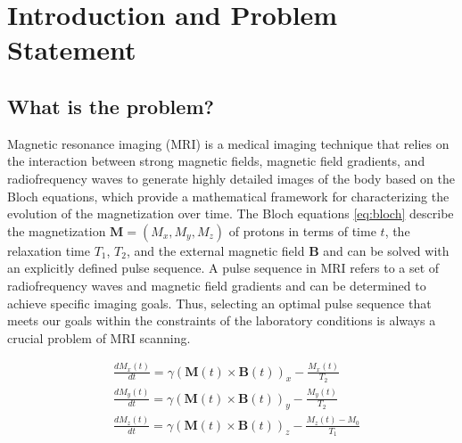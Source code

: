 \section{Introduction and Problem Statement}
\subsection{What is the problem?}
Magnetic resonance imaging (MRI) is a medical imaging technique that relies on the interaction between strong magnetic fields, magnetic field gradients, and radiofrequency waves to generate highly detailed images of the body based on the Bloch equations, which provide a mathematical framework for characterizing the evolution of the magnetization over time. The Bloch equations \eqref{eq:bloch} describe the magnetization $\mathbf{M}=(M_x, M_y, M_z)$ of protons in terms of time $t$, the relaxation time $T_1$, $T_2$, and the external magnetic field $\mathbf{B}$ and can be solved with an explicitly defined pulse sequence. A pulse sequence in MRI refers to a set of radiofrequency waves and magnetic field gradients and can be determined to achieve specific imaging goals. Thus, selecting an optimal pulse sequence that meets our goals within the constraints of the laboratory conditions is always a crucial problem of MRI scanning.

\begin{equation}
    \begin{aligned}\label{eq:bloch}
    & \frac{d M_x(t)}{d t}=\gamma(\mathbf{M}(t) \times \mathbf{B}(t))_x-\frac{M_x(t)}{T_2} \\
    & \frac{d M_y(t)}{d t}=\gamma(\mathbf{M}(t) \times \mathbf{B}(t))_y-\frac{M_y(t)}{T_2} \\
    & \frac{d M_z(t)}{d t}=\gamma(\mathbf{M}(t) \times \mathbf{B}(t))_z-\frac{M_z(t)-M_0}{T_1}
    \end{aligned}
\end{equation}

